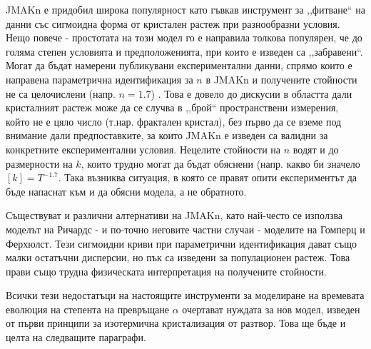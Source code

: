 JMAKn е придобил широка популярност като гъвкав инструмент за ,,фитване`` на данни със сигмоидна форма от кристален растеж при разнообразни условия. Нещо повече - простотата на този модел го е направила толкова популярен, че до голяма степен условията и предположенията, при които е изведен са ,,забравени``. Могат да бъдат намерени публикувани експериментални данни, спрямо които е направена параметрична идентификация за $n$ в JMAKn и получените стойности не са целочислени (напр. $n = 1.7$) \cite{Min2005}. Това е довело до дискусии в областта дали кристалният растеж може да се случва в ,,брой`` пространствени измерения, който не е цяло число (т.нар. фрактален кристал), без първо да се вземе под внимание дали предпоставките, за които JMAKn е изведен са валидни за конкретните експериментални условия. Нецелите стойности на $n$ водят и до размерности на $k$, които трудно могат да бъдат обяснени (напр. какво би значело $[k]=T^{-1.7}$. Така възниква ситуация, в която се правят опити експериментът да бъде напаснат към и да обясни модела, а не обратното.

Съществуват и различни алтернативи на JMAKn, като най-често се използва моделът на Ричардс - и по-точно неговите частни случаи - моделите на Гомперц и Ферхюлст. Тези сигмоидни криви при параметрични идентификация дават също малки остатъчни дисперсии, но пък са изведени за популационен растеж. Това прави също трудна физическата интерпретация на получените стойности.

Всички тези недостатъци на настоящите инструменти за моделиране на времевата еволюция на степента на превръщане $\alpha$ очертават нуждата за нов модел, изведен от първи принципи за изотермична кристализация от разтвор. Това ще бъде и целта на следващите параграфи.
